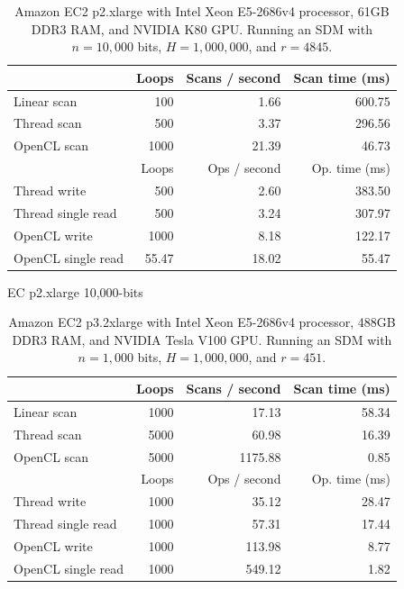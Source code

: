 \begin{table}[!htb]
\centering
\begin{tabular}{| l | r | r | r |}
    \hline
    & Loops & Scans / second & Scan time (ms) \\ \hline
    Linear scan & 100 & 1.66 & 600.75 \\
    Thread scan & 500 & 3.37 & 296.56 \\
    OpenCL scan & 1000 & 21.39 & 46.73 \\ \hline
    \hline
    & Loops & Ops / second & Op. time (ms) \\ \hline
    Thread write & 500 & 2.60 & 383.50 \\
    Thread single read & 500 & 3.24 & 307.97 \\
    OpenCL write & 1000 & 8.18 & 122.17 \\
    OpenCL single read & 55.47 & 18.02 & 55.47 \\
    \hline
\end{tabular}
\caption{EC p2.xlarge 10,000-bits}
\caption{Amazon EC2 p2.xlarge with Intel Xeon E5-2686v4 processor, 61GB DDR3 RAM, and NVIDIA K80 GPU. Running an SDM with $n=10,000$ bits, $H=1,000,000$, and $r=4845$.}
\end{table}


\begin{table}[!htb]
\centering
\begin{tabular}{| l | r | r | r |}
    \hline
    & Loops & Scans / second & Scan time (ms) \\ \hline
    Linear scan & 1000 & 17.13 & 58.34 \\
    Thread scan & 5000 & 60.98 & 16.39 \\
    OpenCL scan & 5000 & 1175.88 & 0.85 \\ \hline
    \hline
    & Loops & Ops / second & Op. time (ms) \\ \hline
    Thread write & 1000 & 35.12 & 28.47 \\
    Thread single read & 1000 & 57.31 & 17.44 \\
    OpenCL write & 1000 & 113.98 & 8.77 \\
    OpenCL single read & 1000 & 549.12 & 1.82 \\
    \hline
\end{tabular}
\caption{Amazon EC2 p3.2xlarge with Intel Xeon E5-2686v4 processor, 488GB DDR3 RAM, and NVIDIA Tesla V100 GPU. Running an SDM with $n=1,000$ bits, $H=1,000,000$, and $r=451$.}
\end{table}

